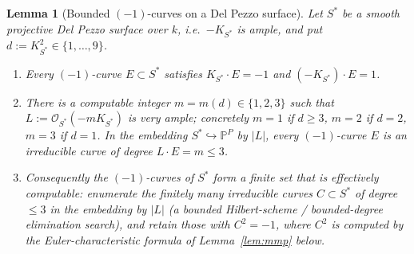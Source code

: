 \documentclass{amsart}
\theoremstyle{plain}
\newtheorem{lemma}{Lemma}
\theoremstyle{definition}
\newcommand{\PP}{\mathbb{P}}
\newcommand{\cO}{\mathcal{O}}
\begin{document}
\begin{lemma}[Bounded $(-1)$-curves on a Del Pezzo surface]\label{lem:dp-bound}
Let $S^\ast$ be a smooth projective Del Pezzo surface over $k$, i.e.\
$-K_{S^\ast}$ is ample, and put $d:=K_{S^\ast}^2\in\{1,\dots,9\}$.
\begin{enumerate}
\item Every $(-1)$-curve $E\subset S^\ast$ satisfies $K_{S^\ast}\cdot E=-1$ and
$(-K_{S^\ast})\cdot E=1$.
\item There is a computable integer $m=m(d)\in\{1,2,3\}$ such that
$L:=\cO_{S^\ast}(-mK_{S^\ast})$ is very ample; concretely $m=1$ if $d\ge3$,
$m=2$ if $d=2$, $m=3$ if $d=1$.  In the embedding $S^\ast\hookrightarrow\PP^P$
by $|L|$, every $(-1)$-curve $E$ is an irreducible curve of degree
$L\cdot E=m\le3$.
\item Consequently the $(-1)$-curves of $S^\ast$ form a finite set that is
effectively computable: enumerate the finitely many irreducible curves
$C\subset S^\ast$ of degree $\le3$ in the embedding by $|L|$
\textup{(}a bounded Hilbert-scheme / bounded-degree elimination search\textup{)},
and retain those with $C^2=-1$, where $C^2$ is computed by the
Euler-characteristic formula of Lemma~\ref{lem:mmp} below.
\end{enumerate}
\end{lemma}
\end{document}
